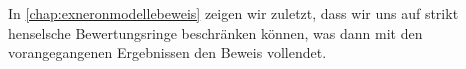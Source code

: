 In \autoref{chap:exneronmodellebeweis} zeigen wir zuletzt, dass wir
uns auf strikt henselsche Bewertungsringe beschränken können, was dann
mit den vorangegangenen Ergebnissen den Beweis vollendet.


